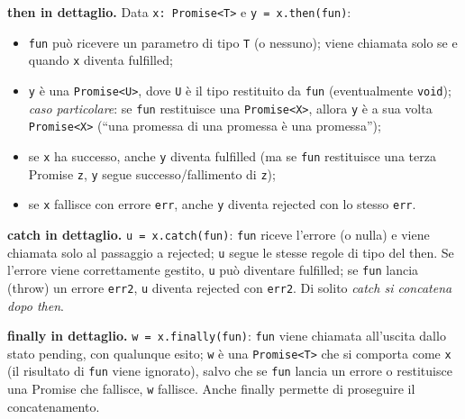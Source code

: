 \textbf{then in dettaglio.} Data \texttt{x: Promise<T>} e \texttt{y = x.then(fun)}:
\begin{itemize}
  \item \texttt{fun} pu\`o ricevere un parametro di tipo \texttt{T} (o nessuno); viene
        chiamata solo se e quando \texttt{x} diventa fulfilled;
  \item \texttt{y} \`e una \texttt{Promise<U>}, dove \texttt{U} \`e il tipo restituito da
        \texttt{fun} (eventualmente \texttt{void}); \emph{caso particolare}: se \texttt{fun}
        restituisce una \texttt{Promise<X>}, allora \texttt{y} \`e a sua volta
        \texttt{Promise<X>} (``una promessa di una promessa \`e una promessa'');
  \item se \texttt{x} ha successo, anche \texttt{y} diventa fulfilled (ma se \texttt{fun}
        restituisce una terza Promise \texttt{z}, \texttt{y} segue successo/fallimento di
        \texttt{z});
  \item se \texttt{x} fallisce con errore \texttt{err}, anche \texttt{y} diventa rejected con
        lo stesso \texttt{err}.
\end{itemize}

\textbf{catch in dettaglio.} \texttt{u = x.catch(fun)}: \texttt{fun} riceve l'errore (o
nulla) e viene chiamata solo al passaggio a rejected; \texttt{u} segue le stesse regole di
tipo del then. Se l'errore viene correttamente gestito, \texttt{u} pu\`o diventare fulfilled;
se \texttt{fun} lancia (throw) un errore \texttt{err2}, \texttt{u} diventa rejected con
\texttt{err2}. Di solito \emph{catch si concatena dopo then}.

\textbf{finally in dettaglio.} \texttt{w = x.finally(fun)}: \texttt{fun} viene chiamata
all'uscita dallo stato pending, con qualunque esito; \texttt{w} \`e una \texttt{Promise<T>}
che si comporta come \texttt{x} (il risultato di \texttt{fun} viene ignorato), salvo che se
\texttt{fun} lancia un errore o restituisce una Promise che fallisce, \texttt{w} fallisce.
Anche finally permette di proseguire il concatenamento.

